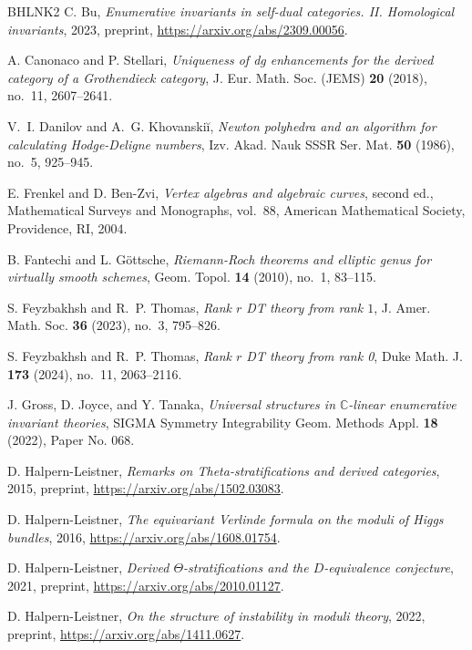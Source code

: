 \documentclass[12pt]{amsart}
\theoremstyle{definition}
\newcommand{\1}{\mathbf 1}
\begin{document}
\begin{thebibliography}{BHLNK2}
C. Bu, \emph{Enumerative invariants in self-dual categories. II. Homological invariants}, 2023, preprint, \url{https://arxiv.org/abs/2309.00056}.

A. Canonaco and P. Stellari, \emph{Uniqueness of dg enhancements for the derived category of a {G}rothendieck category}, J. Eur. Math. Soc. (JEMS) \textbf{20} (2018), no.~11, 2607--2641.

V.~I. Danilov and A.~G. Khovanski{\u i}, \emph{Newton polyhedra and an algorithm for calculating {H}odge-{D}eligne numbers}, Izv. Akad. Nauk SSSR Ser. Mat. \textbf{50} (1986), no.~5, 925--945.

E. Frenkel and D. Ben-Zvi, \emph{Vertex algebras and algebraic curves}, second ed., Mathematical Surveys and Monographs, vol.~88, American Mathematical Society, Providence, RI, 2004.

B. Fantechi and L. G\"{o}ttsche, \emph{Riemann-{R}och theorems and elliptic genus for virtually smooth schemes}, Geom. Topol. \textbf{14} (2010), no.~1, 83--115.

S. Feyzbakhsh and R.~P. Thomas, \emph{Rank {$r$} {DT} theory from rank {$1$}}, J. Amer. Math. Soc. \textbf{36} (2023), no.~3, 795--826.

S. Feyzbakhsh and R.~P. Thomas, \emph{Rank {$r$} {DT} theory from rank 0}, Duke Math. J. \textbf{173} (2024), no.~11, 2063--2116.

J. Gross, D. Joyce, and Y. Tanaka, \emph{Universal structures in {$\mathbb C$}-linear enumerative invariant theories}, SIGMA Symmetry Integrability Geom. Methods Appl. \textbf{18} (2022), Paper No. 068.

D. Halpern-Leistner, \emph{Remarks on Theta-stratifications and derived categories}, 2015, preprint, \url{https://arxiv.org/abs/1502.03083}.

D. Halpern-Leistner, \emph{The equivariant Verlinde formula on the moduli of Higgs bundles}, 2016, \url{https://arxiv.org/abs/1608.01754}.

D. Halpern-Leistner, \emph{Derived $\Theta$-stratifications and the $D$-equivalence conjecture}, 2021, preprint, \url{https://arxiv.org/abs/2010.01127}.

D. Halpern-Leistner, \emph{On the structure of instability in moduli theory}, 2022, preprint, \url{https://arxiv.org/abs/1411.0627}.


\end{thebibliography}
\end{document}
